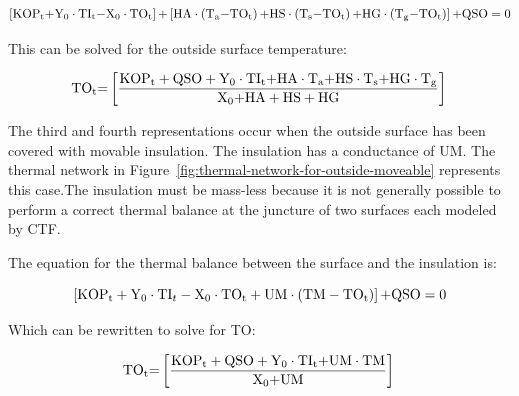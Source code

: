 \begin{equation}
\left[ {{\rm{KO}}{{\rm{P}}_{\rm{t}}}{\rm{ + }}{{\rm{Y}}_{\rm{0}}}\cdot {\rm{T}}{{\rm{I}}_{\rm{t}}}{\rm{ - }}{{\rm{X}}_{\rm{0}}}\cdot {\rm{T}}{{\rm{O}}_{\rm{t}}}} \right]{\rm{ + }}\left[ {{\rm{HA}}\cdot \left( {{{\rm{T}}_{\rm{a}}}{\rm{ - T}}{{\rm{O}}_{\rm{t}}}} \right){\rm{ + HS}}\cdot \left( {{{\rm{T}}_{\rm{s}}}{\rm{ - T}}{{\rm{O}}_{\rm{t}}}} \right){\rm{ + HG}}\cdot \left( {{{\rm{T}}_{\rm{g}}}{\rm{ - T}}{{\rm{O}}_{\rm{t}}}} \right)} \right]{\rm{  + QSO  =  0  }}
\label{eq:MoreDetailedOutsideSurfHeatBalEq}
\end{equation}

This can be solved for the outside surface temperature:

\begin{equation}
{\rm{T}}{{\rm{O}}_{\rm{t}}}{\rm{ = }}\left[ {\frac{{{\rm{KO}}{{\rm{P}}_{\rm{t}}} + {\rm{QSO}} + {{\rm{Y}}_0}\cdot {\rm{T}}{{\rm{I}}_{\rm{t}}}{\rm{ + HA}}\cdot {{\rm{T}}_{\rm{a}}}{\rm{ + HS}}\cdot {{\rm{T}}_{\rm{s}}}{\rm{ + HG}}\cdot {{\rm{T}}_{\rm{g}}}}}{{{{\rm{X}}_{\rm{0}}}{\rm{ + HA + HS + HG}}}}} \right]{\rm{  }}
\end{equation}

The third and fourth representations occur when the outside surface has been covered with movable insulation. The insulation has a conductance of UM. The thermal network in Figure~\ref{fig:thermal-network-for-outside-moveable} represents this case.The insulation must be mass-less because it is not generally possible to perform a correct thermal balance at the juncture of two surfaces each modeled by CTF.

The equation for the thermal balance between the surface and the insulation is:

\begin{equation}
\left[ {{\rm{KO}}{{\rm{P}}_{\rm{t}}} + {{\rm{Y}}_{\rm{0}}}\cdot {\rm{T}}{{\rm{I}}_t} - {{\rm{X}}_{\rm{0}}}\cdot {\rm{T}}{{\rm{O}}_{\rm{t}}} + {\rm{UM}}\cdot \left( {{\rm{TM - T}}{{\rm{O}}_{\rm{t}}}} \right)} \right]{\rm{ + QSO  =  0}}
\end{equation}

Which can be rewritten to solve for TO:

\begin{equation}
{\rm{T}}{{\rm{O}}_{\rm{t}}}{\rm{ = }}\left[ {\frac{{{\rm{KO}}{{\rm{P}}_{\rm{t}}} + {\rm{QSO}} + {{\rm{Y}}_0}\cdot {\rm{T}}{{\rm{I}}_{\rm{t}}}{\rm{ + UM}}\cdot {\rm{TM}}}}{{{{\rm{X}}_{\rm{0}}}{\rm{ + UM}}}}} \right]{\rm{  }}
\label{eq:HeatBalEqforTo}
\end{equation}

